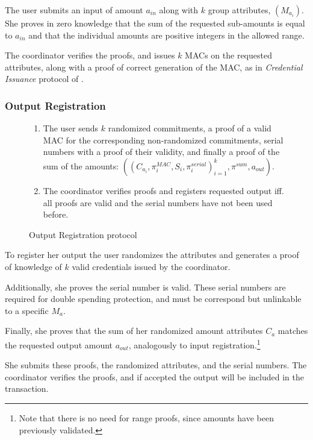 \documentclass[a4paper]{article}
\begin{document}
The user submits an input of amount $a_{\mathit{in}}$ along with $k$ group attributes, $(M_{a_i})$.
She proves in zero knowledge that the sum of the requested sub-amounts is equal to $a_{\mathit{in}}$ and that the individual amounts are positive integers in the allowed range.

The coordinator verifies the proofs, and issues $k$ MACs on the requested attributes, along with a proof of correct generation of the MAC, as in \textit{Credential Issuance} protocol of \cite{chase2019signal}.

\subsubsection{Output Registration}

\begin{figure}[h!]
    \begin{mdframed}
    \begin{enumerate}
        \item The user sends $k$ randomized commitments, a proof of a valid MAC for the corresponding non-randomized commitments, serial numbers with a proof of their validity, and finally a proof of the sum of the amounts: $((C_{a_i},\pi_{i}^{\textit{MAC}},S_i,\pi_i^{\textit{serial}})^{k}_{i=1}, \pi^{\textit{sum}}, a_{\textit{out}})$.
        \item The coordinator verifies proofs and registers requested output iff. all proofs are valid and the serial numbers have not been used before.
    \end{enumerate}
\end{mdframed}
    \caption{Output Registration protocol}
    \label{fig:outputreg}
\end{figure}

To register her output the user randomizes the attributes and generates a proof of knowledge of $k$ valid credentials issued by the coordinator.

Additionally, she proves the serial number is valid. These serial numbers are required for double spending protection, and must be correspond but unlinkable to a specific $M_a$.

Finally, she proves that the sum of her randomized amount attributes $C_a$ matches the requested output amount $a_{\mathit{out}}$, analogously to input registration.\footnote{Note that there is no need for range proofs, since amounts have been previously validated.}

She submits these proofs, the randomized attributes, and the serial numbers. The coordinator verifies the proofs, and if accepted the output will be included in the transaction.
\end{document}
